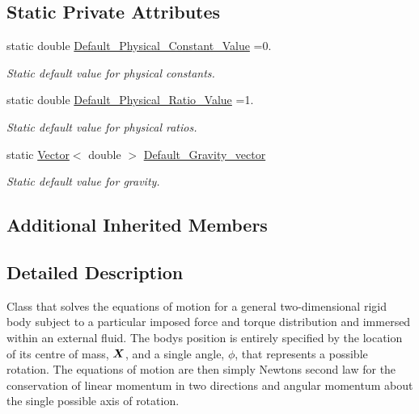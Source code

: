 \subsection*{Static Private Attributes}
\begin{DoxyCompactItemize}
\item 
static double \hyperlink{classoomph_1_1ImmersedRigidBodyElement_a2acb4ef1ef706dfda4d2600875419efc}{Default\+\_\+\+Physical\+\_\+\+Constant\+\_\+\+Value} =0.
\begin{DoxyCompactList}\small\item\em Static default value for physical constants. \end{DoxyCompactList}\item 
static double \hyperlink{classoomph_1_1ImmersedRigidBodyElement_af4a4c84c02fdcaebfc529a575ee57971}{Default\+\_\+\+Physical\+\_\+\+Ratio\+\_\+\+Value} =1.
\begin{DoxyCompactList}\small\item\em Static default value for physical ratios. \end{DoxyCompactList}\item 
static \hyperlink{classoomph_1_1Vector}{Vector}$<$ double $>$ \hyperlink{classoomph_1_1ImmersedRigidBodyElement_a95ee4a622282d5c1c79318bc17468cf0}{Default\+\_\+\+Gravity\+\_\+vector}
\begin{DoxyCompactList}\small\item\em Static default value for gravity. \end{DoxyCompactList}\end{DoxyCompactItemize}
\subsection*{Additional Inherited Members}


\subsection{Detailed Description}
Class that solves the equations of motion for a general two-\/dimensional rigid body subject to a particular imposed force and torque distribution and immersed within an external fluid. The body\textquotesingle{}s position is entirely specified by the location of its centre of mass, $\mbox{\boldmath$X$}$, and a single angle, $\phi$, that represents a possible rotation. The equations of motion are then simply Newton\textquotesingle{}s second law for the conservation of linear momentum in two directions and angular momentum about the single possible axis of rotation.

